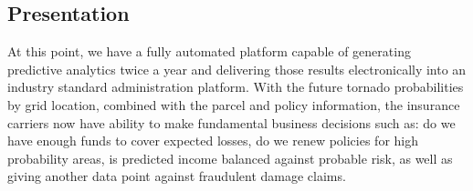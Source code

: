 \subsection{Presentation}


At this point, we have a fully automated platform capable of generating predictive analytics twice a year and delivering those results electronically into an industry standard administration platform. With the future tornado probabilities by grid location, combined with the parcel and policy information, the insurance carriers now have ability to make fundamental business decisions such as: do we have enough funds to cover expected losses, do we renew policies for high probability areas, is predicted income balanced against probable risk, as well as giving another data point against fraudulent damage claims. 
